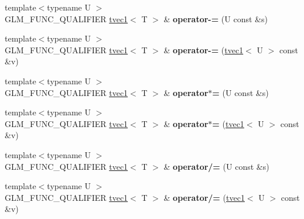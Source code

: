 \begin{DoxyCompactItemize}
\item 
\hypertarget{structglm_1_1detail_1_1tvec1_a771f4c0d41cd631d441860fffb0cccd6}{}{\footnotesize template$<$typename U $>$ }\\G\+L\+M\+\_\+\+F\+U\+N\+C\+\_\+\+Q\+U\+A\+L\+I\+F\+I\+E\+R \hyperlink{structglm_1_1detail_1_1tvec1}{tvec1}$<$ T $>$ \& {\bfseries operator-\/=} (U const \&s)\label{structglm_1_1detail_1_1tvec1_a771f4c0d41cd631d441860fffb0cccd6}

\item 
\hypertarget{structglm_1_1detail_1_1tvec1_ae383c53bd24ad1d9a749c83353b9ec9a}{}{\footnotesize template$<$typename U $>$ }\\G\+L\+M\+\_\+\+F\+U\+N\+C\+\_\+\+Q\+U\+A\+L\+I\+F\+I\+E\+R \hyperlink{structglm_1_1detail_1_1tvec1}{tvec1}$<$ T $>$ \& {\bfseries operator-\/=} (\hyperlink{structglm_1_1detail_1_1tvec1}{tvec1}$<$ U $>$ const \&v)\label{structglm_1_1detail_1_1tvec1_ae383c53bd24ad1d9a749c83353b9ec9a}

\item 
\hypertarget{structglm_1_1detail_1_1tvec1_a46e23ec90043f1ccab970fd5675c782c}{}{\footnotesize template$<$typename U $>$ }\\G\+L\+M\+\_\+\+F\+U\+N\+C\+\_\+\+Q\+U\+A\+L\+I\+F\+I\+E\+R \hyperlink{structglm_1_1detail_1_1tvec1}{tvec1}$<$ T $>$ \& {\bfseries operator$\ast$=} (U const \&s)\label{structglm_1_1detail_1_1tvec1_a46e23ec90043f1ccab970fd5675c782c}

\item 
\hypertarget{structglm_1_1detail_1_1tvec1_a0f02cfcc917aecd7f4320d644ffd15aa}{}{\footnotesize template$<$typename U $>$ }\\G\+L\+M\+\_\+\+F\+U\+N\+C\+\_\+\+Q\+U\+A\+L\+I\+F\+I\+E\+R \hyperlink{structglm_1_1detail_1_1tvec1}{tvec1}$<$ T $>$ \& {\bfseries operator$\ast$=} (\hyperlink{structglm_1_1detail_1_1tvec1}{tvec1}$<$ U $>$ const \&v)\label{structglm_1_1detail_1_1tvec1_a0f02cfcc917aecd7f4320d644ffd15aa}

\item 
\hypertarget{structglm_1_1detail_1_1tvec1_a2b2c4d88644c420e9be670a520e3c92a}{}{\footnotesize template$<$typename U $>$ }\\G\+L\+M\+\_\+\+F\+U\+N\+C\+\_\+\+Q\+U\+A\+L\+I\+F\+I\+E\+R \hyperlink{structglm_1_1detail_1_1tvec1}{tvec1}$<$ T $>$ \& {\bfseries operator/=} (U const \&s)\label{structglm_1_1detail_1_1tvec1_a2b2c4d88644c420e9be670a520e3c92a}

\item 
\hypertarget{structglm_1_1detail_1_1tvec1_a226743ae3ce8afb646fd681ef0ba061b}{}{\footnotesize template$<$typename U $>$ }\\G\+L\+M\+\_\+\+F\+U\+N\+C\+\_\+\+Q\+U\+A\+L\+I\+F\+I\+E\+R \hyperlink{structglm_1_1detail_1_1tvec1}{tvec1}$<$ T $>$ \& {\bfseries operator/=} (\hyperlink{structglm_1_1detail_1_1tvec1}{tvec1}$<$ U $>$ const \&v)\label{structglm_1_1detail_1_1tvec1_a226743ae3ce8afb646fd681ef0ba061b}


\end{DoxyCompactItemize}
